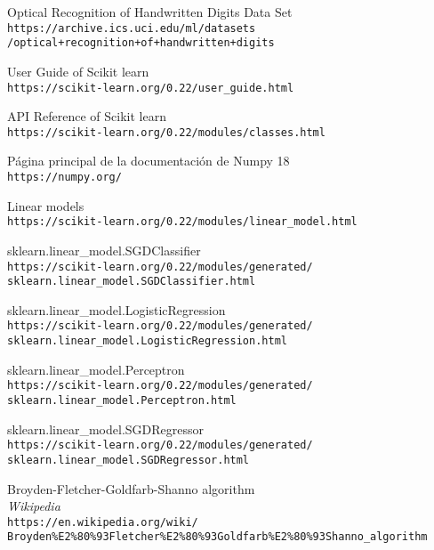 \begin{thebibliography}{9}

Optical Recognition of Handwritten Digits Data Set
\\\texttt{https://archive.ics.uci.edu/ml/datasets
\\/optical+recognition+of+handwritten+digits}

User Guide of Scikit learn
\\\texttt{https://scikit-learn.org/0.22/user\_guide.html}

API Reference of Scikit learn
\\\texttt{https://scikit-learn.org/0.22/modules/classes.html}

Página principal de la documentación de Numpy 18
\\\texttt{https://numpy.org/}

Linear models
\\\texttt{https://scikit-learn.org/0.22/modules/linear\_model.html}

sklearn.linear\_model.SGDClassifier
\\\texttt{https://scikit-learn.org/0.22/modules/generated/\\sklearn.linear\_model.SGDClassifier.html}

sklearn.linear\_model.LogisticRegression
\\\texttt{https://scikit-learn.org/0.22/modules/generated/\\sklearn.linear\_model.LogisticRegression.html}

sklearn.linear\_model.Perceptron
\\\texttt{https://scikit-learn.org/0.22/modules/generated/\\sklearn.linear\_model.Perceptron.html}

sklearn.linear\_model.SGDRegressor
\\\texttt{https://scikit-learn.org/0.22/modules/generated/\\sklearn.linear\_model.SGDRegressor.html}

Broyden-Fletcher-Goldfarb-Shanno algorithm
\\\textit{Wikipedia}
\\\texttt{https://en.wikipedia.org/wiki/\\Broyden\%E2\%80\%93Fletcher\%E2\%80\%93Goldfarb\%E2\%80\%93Shanno\_algorithm}


\end{thebibliography}
